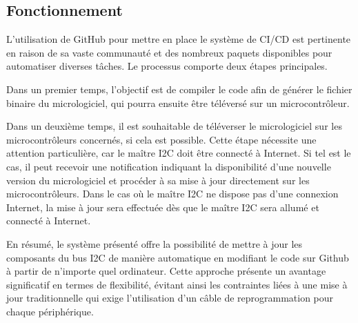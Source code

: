 \subsection{Fonctionnement}

L'utilisation de GitHub pour mettre en place le système de CI/CD est pertinente en raison de sa vaste communauté et des nombreux paquets disponibles pour automatiser diverses tâches.
Le processus comporte deux étapes principales.

Dans un premier temps, l'objectif est de compiler le code afin de générer le fichier binaire du micrologiciel, qui pourra ensuite être téléversé sur un microcontrôleur.

Dans un deuxième temps, il est souhaitable de téléverser le micrologiciel sur les microcontrôleurs concernés, si cela est possible.
Cette étape nécessite une attention particulière, car le maître I2C doit être connecté à Internet.
Si tel est le cas, il peut recevoir une notification indiquant la disponibilité d'une nouvelle version du micrologiciel et procéder à sa mise à jour directement sur les microcontrôleurs. Dans le cas où le maître I2C ne dispose pas d'une connexion Internet, la mise à jour sera effectuée dès que le maître I2C sera allumé et connecté à Internet.

En résumé, le système présenté offre la possibilité de mettre à jour les composants du bus I2C de manière automatique en modifiant le code sur Github à partir de n'importe quel ordinateur.
Cette approche présente un avantage significatif en termes de flexibilité, évitant ainsi les contraintes liées à une mise à jour traditionnelle qui exige l'utilisation d'un câble de reprogrammation pour chaque périphérique.